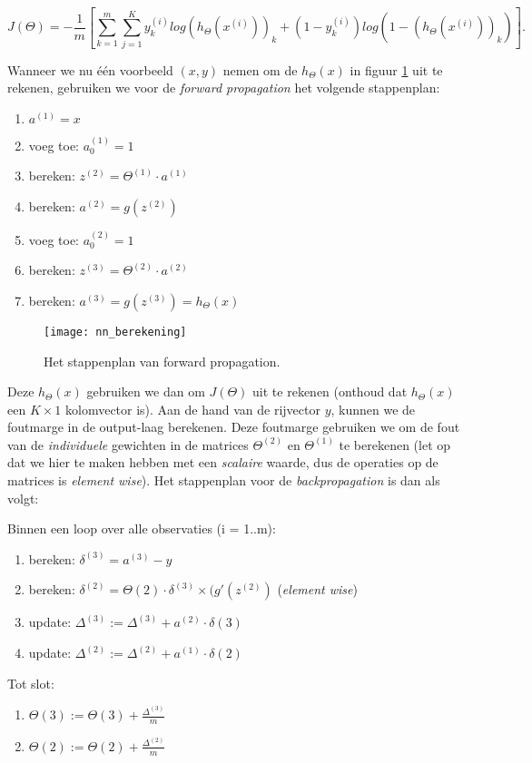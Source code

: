 \[
J(\Theta) = -\frac{1}{m}\left[\sum_{k=1}^m\sum_{j=1}^K 
  y_k^{(i)}log(h_\Theta(x^{(i)}))_k +
  (1-y_k^{(i)})log(1-(h_\Theta(x^{(i)}))_k) \right].
\]

Wanneer we nu één voorbeeld $(x,y)$ nemen om de $h_\Theta(x)$ in figuur \ref{img:nn_berekening} uit te rekenen, gebruiken we voor de \textit{forward propagation} het volgende stappenplan:

\begin{enumerate}
\item $a^{(1)} = x$
\item voeg toe: $a_0^{(1)} = 1$
\item bereken: $z^{(2)} = \Theta^{(1)}\cdot a^{(1)}$
\item bereken: $a^{(2)} = g(z^{(2)})$
\item voeg toe: $a_0^{(2)}=1$
\item bereken: $z^{(3)} = \Theta^{(2)}\cdot a^{(2)}$
\item bereken: $a^{(3)} = g(z^{(3)}) = h_\Theta(x)$
\end{enumerate}

\begin{figure}[h]
\centering
\texttt{[image: nn\_berekening]}
\caption{Het stappenplan van forward propagation.\label{img:nn_berekening}}
\end{figure}

Deze $h_\Theta(x)$ gebruiken we dan om $J(\Theta)$ uit te rekenen (onthoud dat $h_\Theta(x)$ een $K \times 1$ kolomvector is). Aan de hand van de rijvector $y$, kunnen we de foutmarge in de output-laag berekenen. Deze foutmarge gebruiken we om de fout van de \textit{individuele} gewichten in de matrices $\Theta^{(2)}$ en $\Theta^{(1)}$ te berekenen (let op dat we hier te maken hebben met een \textit{scalaire} waarde, dus de operaties op de matrices is \textit{element wise}). Het stappenplan voor de \textit{backpropagation} is dan als volgt:

Binnen een loop over alle observaties (i = 1..m):
\begin{enumerate}
\item bereken: $\delta^{(3)} = a^{(3)} - y$
\item bereken: $\delta^{(2)} = \Theta{(2)} \cdot \delta^{(3)} \times (g'(z^{(2)})$ (\textit{element wise})
\item update: $\Delta^{(3)} := \Delta^{(3)} + a^{(2)} \cdot \delta{(3)}$
\item update: $\Delta^{(2)} := \Delta^{(2)} + a^{(1)} \cdot \delta{(2)}$
\end{enumerate}

Tot slot:
\begin{enumerate}
\item $\Theta{(3)} := \Theta{(3)} + \frac{\Delta^{(3)}}{m}$
\item $\Theta{(2)} := \Theta{(2)} + \frac{\Delta^{(2)}}{m}$
\end{enumerate}
